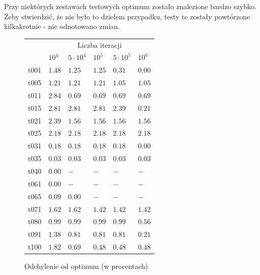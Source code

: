 \documentclass[12pt]{article}
\begin{document}
Przy niektórych zestawach testowych optimum zostało znalezione bardzo szybko. Żeby stwierdzić, że nie było to dziełem przypadku, testy te zostały
powtórzone kilkakrotnie - nie odnotowano zmian.

\begin{figure}
  \centering
    \begin{tabular}{l|l|l|l|l|l|} \cline{2-6}
     & \multicolumn{5}{|c|}{Liczba iteracji} \\ \cline{2-6}
                                & $10^4$  & $5\cdot 10^4$ & $10^5$ & $5\cdot 10^5$ & $10^6$ \\ \hline
    \multicolumn{1}{|c|}{t001} 	& $1.48$  & $1.25$        & $1.25$ & $0.31$        & $0.00$ \\ \hline
    \multicolumn{1}{|c|}{t005} 	& $1.21$  & $1.21$        & $1.21$ & $1.05$        & $1.05$ \\ \hline
    \multicolumn{1}{|c|}{t011} 	& $2.84$  & $0.69$        & $0.69$ & $0.69$        & $0.69$ \\ \hline
    \multicolumn{1}{|c|}{t015} 	& $2.81$  & $2.81$        & $2.81$ & $2.39$        & $0.21$ \\ \hline
    \multicolumn{1}{|c|}{t021} 	& $2.39$  & $1.56$        & $1.56$ & $1.56$        & $1.56$ \\ \hline
    \multicolumn{1}{|c|}{t025} 	& $2.18$  & $2.18$        & $2.18$ & $2.18$        & $2.18$ \\ \hline
    \multicolumn{1}{|c|}{t031} 	& $0.18$  & $0.18$        & $0.18$ & $0.18$        & $0.00$ \\ \hline
    \multicolumn{1}{|c|}{t035} 	& $0.03$  & $0.03$        & $0.03$ & $0.03$        & $0.03$ \\ \hline
    \multicolumn{1}{|c|}{t040} 	& $0.00$  & $-$           & $-$    & $-$           & $-$    \\ \hline
    \multicolumn{1}{|c|}{t061} 	& $0.00$  & $-$           & $-$    & $-$           & $-$    \\ \hline
    \multicolumn{1}{|c|}{t065} 	& $0.09$  & $0.00$        & $-$    & $-$           & $-$    \\ \hline
    \multicolumn{1}{|c|}{t071} 	& $1.62$  & $1.62$        & $1.42$ & $1.42$        & $1.42$ \\ \hline
    \multicolumn{1}{|c|}{t080} 	& $0.99$  & $0.99$        & $0.99$ & $0.99$        & $0.56$ \\ \hline
    \multicolumn{1}{|c|}{t091} 	& $1.38$  & $0.81$        & $0.81$ & $0.81$        & $0.21$ \\ \hline  
    \multicolumn{1}{|c|}{t100} 	& $1.82$  & $0.69$        & $0.48$ & $0.48$        & $0.48$ \\ \hline
    \end{tabular}
  \caption{Odchylenie od optimum (w procentach)}
  \label{tab:extreme}
\end{figure}
\end{document}
